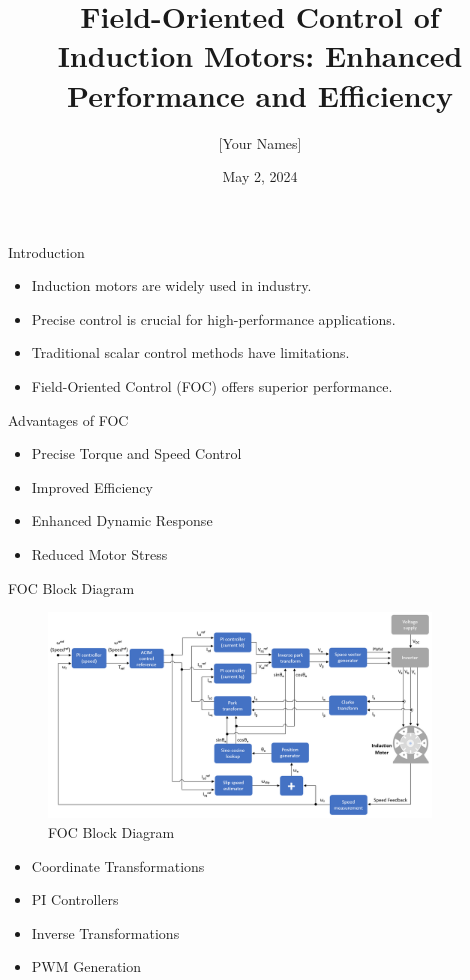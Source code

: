 \documentclass{beamer}
\title{Field-Oriented Control of Induction Motors: Enhanced Performance and Efficiency}
\author{[Your Names]}
\institute{Rajalakshmi Engineering College}
\date{May 2, 2024}
\begin{document}
\begin{frame}
  \titlepage
\end{frame}

\begin{frame}{Introduction}
  \begin{itemize}
    \item Induction motors are widely used in industry.
    \item Precise control is crucial for high-performance applications.
    \item Traditional scalar control methods have limitations.
    \item Field-Oriented Control (FOC) offers superior performance.
  \end{itemize}
\end{frame}

\begin{frame}{Advantages of FOC}
  \begin{itemize}
    \item Precise Torque and Speed Control
    \item Improved Efficiency
    \item Enhanced Dynamic Response
    \item Reduced Motor Stress
  \end{itemize}
\end{frame}

\begin{frame}{FOC Block Diagram}
  \begin{figure}
    \includegraphics[width=4in]{conference/blockDiagram.png} %
    \caption{FOC Block Diagram}
  \end{figure}
  \begin{itemize}
    \item Coordinate Transformations
    \item PI Controllers
    \item Inverse Transformations
    \item PWM Generation
  \end{itemize}
\end{frame}
\end{document}
